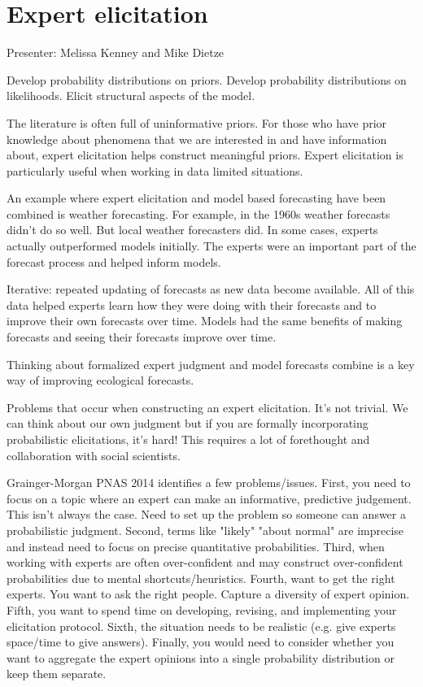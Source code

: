 \documentclass[12pt, oneside]{article}   	%
\begin{document}
\section{Expert elicitation}

Presenter: Melissa Kenney and Mike Dietze

Develop probability distributions on priors. 
Develop probability distributions on likelihoods.
Elicit structural aspects of the model.

The literature is often full of uninformative priors. For those who have prior knowledge about phenomena that we are interested in and have information about, expert elicitation helps construct meaningful priors. Expert elicitation is particularly useful when working in data limited situations. 

An example where expert elicitation and model based forecasting have been combined is weather forecasting. For example, in the 1960s weather forecasts didn't do so well. But local weather forecasters did. In some cases, experts actually outperformed models initially. The experts were an important part of the forecast process and helped inform models.

Iterative: repeated updating of forecasts as new data become available. All of this data helped experts learn how they were doing with their forecasts and to improve their own forecasts over time. Models had the same benefits of making forecasts and seeing their forecasts improve over time.

Thinking about formalized expert judgment and model forecasts combine is a key way of improving ecological forecasts.

Problems that occur when constructing an expert elicitation. It's not trivial. We can think about our own judgment but if you are formally incorporating probabilistic elicitations, it's hard! This requires a lot of forethought and collaboration with social scientists. 

Grainger-Morgan PNAS 2014 \cite{morgan2014} identifies a few problems/issues. First, you need to focus on a topic where an expert can make an informative, predictive judgement. This isn't always the case. Need to set up the problem so someone can answer a probabilistic judgment. Second, terms like "likely" "about normal" are imprecise and instead need to focus on precise quantitative probabilities. Third, when working with experts are often over-confident and may construct over-confident probabilities due to mental shortcuts/heuristics. Fourth, want to get the right experts. You want to ask the right people. Capture a diversity of expert opinion. Fifth, you want to spend time on developing, revising, and implementing your elicitation protocol. Sixth, the situation needs to be realistic (e.g. give experts space/time to give answers). Finally, you would need to consider whether you want to aggregate the expert opinions into a single probability distribution or keep them separate.
\end{document}
